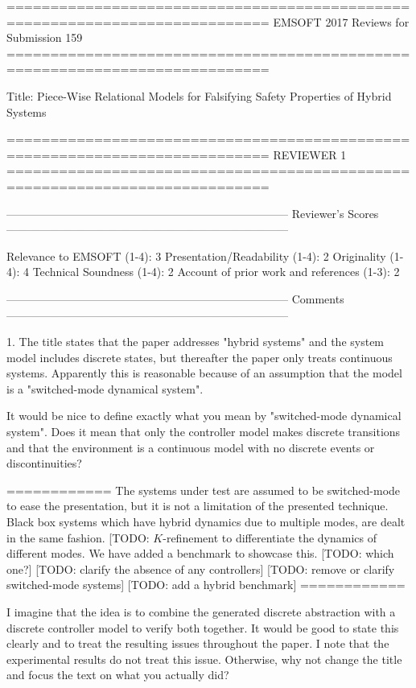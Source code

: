 ============================================================================
EMSOFT 2017 Reviews for Submission 159
============================================================================

Title: Piece-Wise Relational Models for Falsifying Safety Properties of Hybrid Systems

============================================================================
                            REVIEWER 1
============================================================================


---------------------------------------------------------------------------
Reviewer's Scores
---------------------------------------------------------------------------

               Relevance to EMSOFT (1-4): 3
          Presentation/Readability (1-4): 2
                       Originality (1-4): 4
               Technical Soundness (1-4): 2
Account of prior work and references (1-3): 2


---------------------------------------------------------------------------
Comments
---------------------------------------------------------------------------


1. The title states that the paper addresses "hybrid systems" and the system
   model includes discrete states, but thereafter the paper only treats
   continuous systems. Apparently this is reasonable because of an
   assumption that the model is a "switched-mode dynamical system".

   It would be nice to define exactly what you mean by "switched-mode
   dynamical system". Does it mean that only the controller model makes
   discrete transitions and that the environment is a continuous model with
   no discrete events or discontinuities?

   ============
   The systems under test are assumed to be switched-mode to ease the
   presentation, but it is not a limitation of the presented
   technique. Black box systems which have hybrid dynamics due to
   multiple modes, are dealt in the same fashion.
   [TODO: $K$-refinement to differentiate the dynamics of different modes.
   We have added a benchmark to showcase this.
   [TODO: which one?]
   [TODO: clarify the absence of any controllers]
   [TODO: remove or clarify switched-mode systems]
   [TODO: add a hybrid benchmark]
   ============

   I imagine that the idea is to combine the generated discrete abstraction
   with a discrete controller model to verify both together. It would be
   good to state this clearly and to treat the resulting issues throughout
   the paper. I note that the experimental results do not treat this issue.
   Otherwise, why not change the title and focus the text on what you
   actually did?

